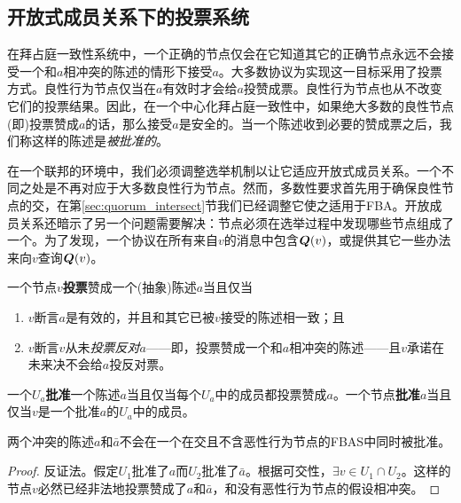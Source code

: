 \subsection{开放式成员关系下的投票系统}

在拜占庭一致性系统中，一个正确的节点仅会在它知道其它的正确节点永远不会接受一个和$a$相冲突的陈述的情形下接受$a$。大多数协议为实现这一目标采用了投票方式。良性行为节点仅当在$a$有效时才会给$a$投赞成票。良性行为节点也从不改变它们的投票结果。因此，在一个中心化拜占庭一致性中，如果绝大多数的良性节点(即{\quorum})投票赞成$a$的话，那么接受$a$是安全的。当一个陈述收到必要的赞成票之后，我们称这样的陈述是\textit{被批准的}。

在一个联邦的环境中，我们必须调整选举机制以让它适应开放式成员关系。一个不同之处是{\quorum}不再对应于大多数良性行为节点。然而，多数性要求首先用于确保良性节点的{\quorum}交，在第\ref{sec:quorum_intersect}节我们已经调整它使之适用于FBA。开放成员关系还暗示了另一个问题需要解决：节点必须在选举过程中发现哪些节点组成了一个{\quorum}。为了发现{\quorum}，一个协议在所有来自$v$的消息中包含${\bm Q}(v)$，或提供其它一些办法来向$v$查询${\bm Q}(v)$。

\begin{definition}[投票]
        一个节点$v$\textbf{投票}赞成一个(抽象)陈述$a$当且仅当
        \begin{enumerate}
                \item $v$断言$a$是有效的，并且和其它已被$v$接受的陈述相一致；且
                \item $v$断言$v$从未\textit{投票反对}$a$——即，投票赞成一个和$a$相冲突的陈述——且$v$承诺在未来决不会给$a$投反对票。
        \end{enumerate}
\end{definition}

\begin{definition}[批准]
        一个{\quorum}$U_a$\textbf{批准}一个陈述$a$当且仅当每个$U_a$中的成员都投票赞成$a$。一个节点\textbf{批准}$a$当且仅当$v$是一个批准$a$的{\quorum}$U_a$中的成员。
\end{definition}

\begin{theorem}\label{thm:cannot_ratify_contradictory}
        两个冲突的陈述$a$和$\bar a$不会在一个在{\quorum}交且不含恶性行为节点的FBAS中同时被批准。
\end{theorem}

\begin{proof}
        反证法。假定{\quorum}$U_1$批准了$a$而{\quorum}$U_2$批准了$\bar a$。根据{\quorum}可交性，$\exists v\in U_1\cap U_2$。这样的节点$v$必然已经非法地投票赞成了$a$和$\bar a$，和没有恶性行为节点的假设相冲突。
\end{proof}

